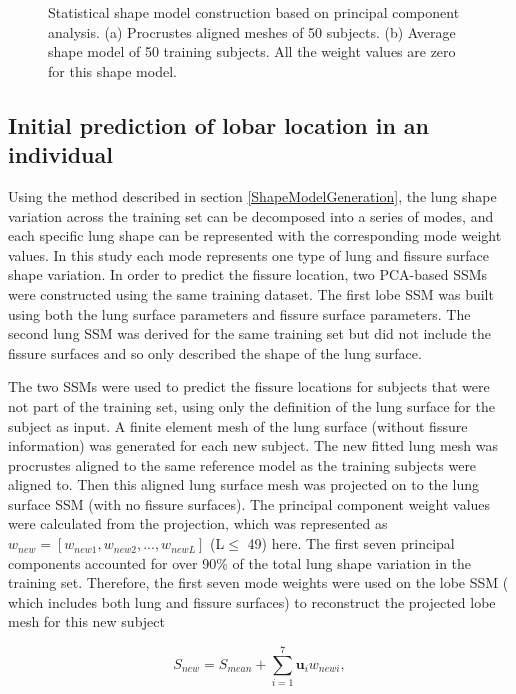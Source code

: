 {\begin{figure}[htbp]
\begin{subfigure}{.4\linewidth}
  \caption{}
  \label{fig:PCAMeshTraining-b} 
\end{subfigure}
\caption{Statistical shape model construction based on principal component analysis. (a) Procrustes aligned meshes of 50 subjects. (b) Average shape model of 50 training subjects. All the weight values are zero for this shape model.}
\label{fig:PCAMeshTraining}
\end{figure}

\subsection{Initial prediction of lobar location in an individual} \label{MeshPrediction}

Using the method described in section \ref{ShapeModelGeneration}, the lung shape variation across the training set can be decomposed into a series of modes, and each specific lung shape can be represented with the corresponding mode weight values. In this study each mode represents one type of lung and fissure surface shape variation. In order to predict the fissure location, two PCA-based SSMs were constructed using the same training dataset. The first lobe SSM was built using both the lung surface parameters and fissure surface parameters. The second lung SSM was derived for the same training set but did not include the fissure surfaces and so only described the shape of the lung surface.

The two SSMs were used to predict the fissure locations for subjects that were not part of the training set, using only the definition of the lung surface for the subject as input. A finite element mesh of the lung surface (without fissure information) was generated for each new subject. The new fitted lung mesh was procrustes aligned to the same reference model as the training subjects were aligned to. Then this aligned lung surface mesh was projected on to the lung surface SSM (with no fissure surfaces). The principal component weight values were calculated from the projection, which was represented as $w_{new} = [w_{new1}, w_{new2}, ..., w_{newL}]$ (L$\leq$ 49) here. The first seven principal components accounted for over 90\% of the total lung shape variation in the training set. Therefore, the first seven mode weights were used on the lobe SSM ( which includes both lung and fissure surfaces) to reconstruct the projected lobe mesh for this new subject

\begin{equation}
 \label{eq:FissurePrediction1}
 S_{new} = S_{mean} + \sum_{i=1}^7 \mathbf{u}_i w_{newi},
\end{equation}

}
